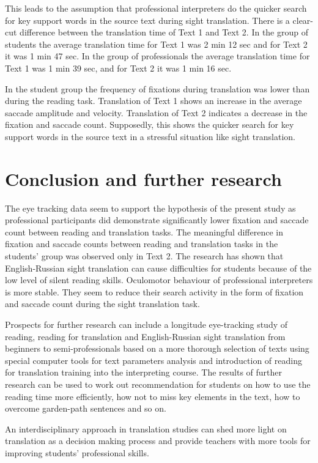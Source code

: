 \documentclass[output=paper]{langscibook}
\begin{document}
This leads to the assumption that professional interpreters do the quicker search for key support words in the source text during sight translation. There is a clear-cut difference between the translation time of Text 1 and Text 2. In the group of students the average translation time for Text 1 was 2 min 12 sec and for Text 2 it was 1 min 47 sec. In the group of professionals the average translation time for Text 1 was 1 min 39 sec, and for Text 2 it was 1 min 16 sec.

In the student group the frequency of fixations during translation was lower than during the reading task. Translation of Text 1 shows an increase in the average saccade amplitude and velocity. Translation of Text 2 indicates a decrease in the fixation and saccade count. Supposedly, this shows the quicker search for key support words in the source text in a stressful situation like sight translation.

\section{Conclusion and further research}
The eye tracking data seem to support the hypothesis of the present study as professional participants did demonstrate significantly lower fixation and saccade count between reading and translation tasks. The meaningful difference in fixation and saccade counts between reading and translation tasks in the students’ group was observed only in Text 2. The research has shown that English-Russian sight translation can cause difficulties for students because of the low level of silent reading skills. Oculomotor behaviour of professional interpreters is more stable. They seem to reduce their search activity in the form of fixation and saccade count during the sight translation task.

Prospects for further research can include a longitude eye-tracking study of reading, reading for translation and English-Russian sight translation from beginners to semi-professionals based on a more thorough selection of texts using special computer tools for text parameters analysis and introduction of reading for translation training into the interpreting course. The results of further research can be used to work out recommendation for students on how to use the reading time more efficiently, how not to miss key elements in the text, how to overcome garden-path sentences and so on.

An interdisciplinary approach in translation studies can shed more light on translation as a decision making process and provide teachers with more tools for improving students’ professional skills.
    

{\sloppy\printbibliography[heading=subbibliography,notkeyword=this]}
\end{document}
